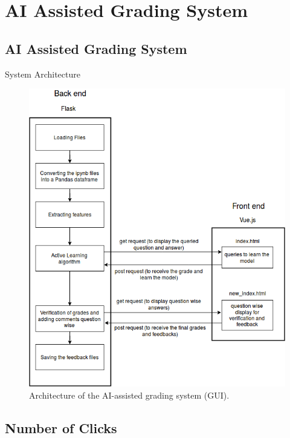 \documentclass{beamer}
\begin{document}
\section{AI Assisted Grading System}


\subsection{AI Assisted Grading System}

\begin{frame}{System Architecture}
	    	\begin{figure}[!htb]
	    		\centering
	    		\includegraphics[scale=0.28]{images/gui_architecture}
	    		\caption{Architecture of the AI-assisted grading system (GUI).}
	    		\label{gui_architecture}
	    	\end{figure}
\end{frame}

\subsection{Number of Clicks}
\end{document}
